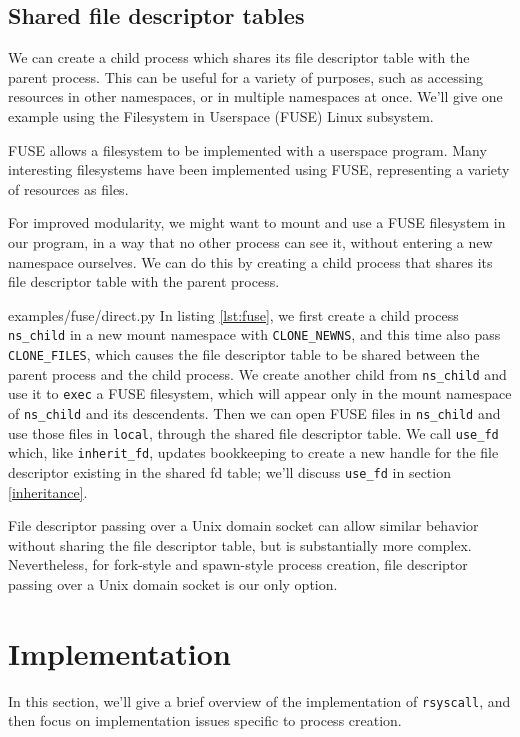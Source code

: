 \documentclass[letterpaper,twocolumn,10pt]{article}
\begin{document}
\subsection{Shared file descriptor tables}\label{shared_fd_table}
We can create a child process which shares its file descriptor table with the parent process.
This can be useful for a variety of purposes,
such as accessing resources in other namespaces, or in multiple namespaces at once.
We'll give one example using the Filesystem in Userspace (FUSE) Linux subsystem.

FUSE\cite{fuse} allows a filesystem to be implemented with a userspace program.
Many interesting filesystems\cite{sshfs}\cite{encfs}\cite{mp3fs} have been implemented using FUSE,
representing a variety of resources as files.

For improved modularity, we might want to mount and use a FUSE filesystem in our program,
in a way that no other process can see it,
without entering a new namespace ourselves.
We can do this by creating a child process that shares its file descriptor table with the parent process.


{examples/fuse/direct.py}
In listing \ref{lst:fuse},
we first create a child process \verb|ns_child| in a new mount namespace with \verb|CLONE_NEWNS|,
and this time also pass \verb|CLONE_FILES|,
which causes the file descriptor table to be shared between the parent process and the child process\cite{clone}.
We create another child from \verb|ns_child|
and use it to \texttt{exec} a FUSE filesystem,
which will appear only in the mount namespace of \verb|ns_child| and its descendents.
Then we can open FUSE files in \verb|ns_child|
and use those files in \texttt{local},
through the shared file descriptor table.
We call \texttt{use\_fd} which, like \texttt{inherit\_fd},
updates bookkeeping to create a new handle for the file descriptor existing in the shared fd table;
we'll discuss \texttt{use\_fd} in section \ref{inheritance}.

File descriptor passing over a Unix domain socket
can allow similar behavior without sharing the file descriptor table,
but is substantially more complex\cite{scm_rights}.
Nevertheless, for fork-style and spawn-style process creation,
file descriptor passing over a Unix domain socket
is our only option.
\section{Implementation}\label{implementation}
In this section, we'll give a brief overview of the implementation of \texttt{rsyscall},
and then focus on implementation issues specific to process creation.
\end{document}
